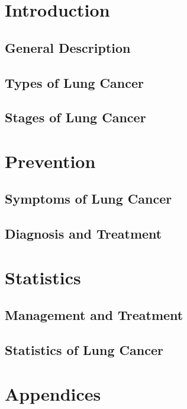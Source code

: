 


\coverpage{\TITLE}{\SUBTITLE}{\AUTHOR}{\DATE}{\SUBJECT}
\newpage
\fpage
\newpage

\tableofcontents


\part{Introduction}
\chapter{General Description}


\chapter{Types of Lung Cancer}


\chapter{Stages of Lung Cancer}


\part{Prevention}
\chapter{Symptoms of Lung Cancer}


\chapter{Diagnosis and Treatment}


\part{Statistics}
\chapter{Management and Treatment}


\chapter{Statistics of Lung Cancer}


\part{Appendices}
\listoffigures
\newpage\printbibliography[title = {References}]

